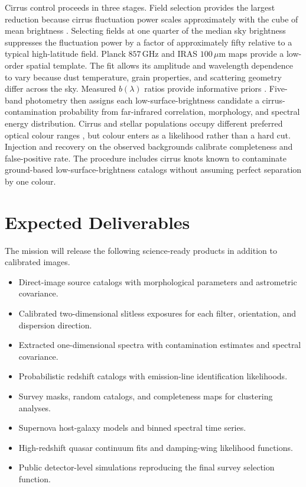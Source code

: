 Cirrus control proceeds in three stages. Field selection provides the largest reduction because cirrus fluctuation power scales approximately with the cube of mean brightness \cite{gautier1992}. Selecting fields at one quarter of the median sky brightness suppresses the fluctuation power by a factor of approximately fifty relative to a typical high-latitude field. Planck $857$\,GHz and IRAS $100\,\mu$m maps provide a low-order spatial template. The fit allows its amplitude and wavelength dependence to vary because dust temperature, grain properties, and scattering geometry differ across the sky. Measured $b(\lambda)$ ratios provide informative priors \cite{ienaka2013}. Five-band photometry then assigns each low-surface-brightness candidate a cirrus-contamination probability from far-infrared correlation, morphology, and spectral energy distribution. Cirrus and stellar populations occupy different preferred optical colour ranges \cite{roman2020}, but colour enters as a likelihood rather than a hard cut. Injection and recovery on the observed backgrounds calibrate completeness and false-positive rate. The procedure includes cirrus knots known to contaminate ground-based low-surface-brightness catalogs \cite{zaritsky2023} without assuming perfect separation by one colour.

\clearpage
\section{Expected Deliverables}

The mission will release the following science-ready products in addition to calibrated images.
\begin{itemize}
  \item Direct-image source catalogs with morphological parameters and astrometric covariance.
  \item Calibrated two-dimensional slitless exposures for each filter, orientation, and dispersion direction.
  \item Extracted one-dimensional spectra with contamination estimates and spectral covariance.
  \item Probabilistic redshift catalogs with emission-line identification likelihoods.
  \item Survey masks, random catalogs, and completeness maps for clustering analyses.
  \item Supernova host-galaxy models and binned spectral time series.
  \item High-redshift quasar continuum fits and damping-wing likelihood functions.
  \item Public detector-level simulations reproducing the final survey selection function.
\end{itemize}

